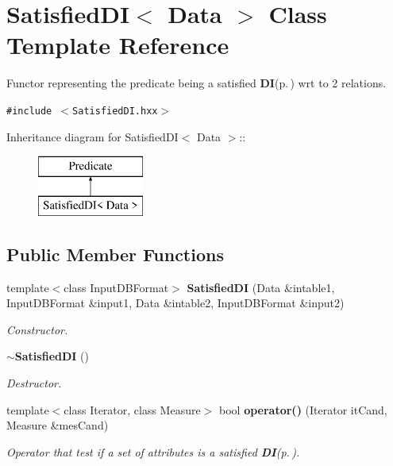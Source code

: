 \section{Satisfied\-DI$<$ Data $>$ Class Template Reference}
\label{class_satisfied_d_i}
Functor representing the predicate being a satisfied {\bf DI}{\rm (p.\,\pageref{class_d_i})} wrt to 2 relations.  


{\tt \#include $<$Satisfied\-DI.hxx$>$}

Inheritance diagram for Satisfied\-DI$<$ Data $>$::\begin{figure}[H]
\begin{center}
\leavevmode
\includegraphics[height=2cm]{class_satisfied_d_i}
\end{center}
\end{figure}
\subsection*{Public Member Functions}
\begin{CompactItemize}
\item 
template$<$class Input\-DBFormat$>$ {\bf Satisfied\-DI} (Data \&intable1, Input\-DBFormat \&input1, Data \&intable2, Input\-DBFormat \&input2)
\begin{CompactList}\small\item\em Constructor. \item\end{CompactList}\item 
{\bf $\sim$Satisfied\-DI} ()\label{class_satisfied_d_i_5e0ee1d4037733aaa542b849bdf98bb9}

\begin{CompactList}\small\item\em Destructor. \item\end{CompactList}\item 
template$<$class Iterator, class Measure$>$ bool {\bf operator()} (Iterator it\-Cand, Measure \&mes\-Cand)
\begin{CompactList}\small\item\em Operator that test if a set of attributes is a satisfied {\bf DI}{\rm (p.\,\pageref{class_d_i})}. \item\end{CompactList}\end{CompactItemize}
